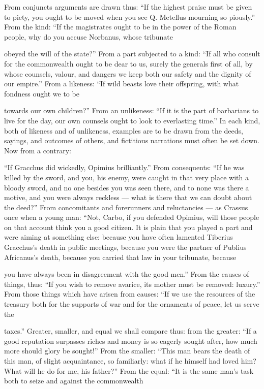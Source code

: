  From conjuncts arguments are drawn thus: ``If the highest praise must be given to piety, you ought to be moved when you see Q. Metellus mourning so piously.'' From the kind: ``If the magistrates ought to be in the power of the Roman people, why do you accuse Norbanus, whose tribunate

 obeyed the will of the state?'' From a part subjected to a kind: ``If all who consult for the commonwealth ought to be dear to us, surely the generals first of all, by whose counsels, valour, and dangers we keep both our safety and the dignity of our empire.'' From a likeness: ``If wild beasts love their offspring, with what fondness ought we to be

 towards our own children?'' From an unlikeness: ``If it is the part of barbarians to live for the day, our own counsels ought to look to everlasting time.'' In each kind, both of likeness and of unlikeness, examples are to be drawn from the deeds, sayings, and outcomes of others, and fictitious narrations must often be set down. Now from a contrary:

 ``If Gracchus did wickedly, Opimius brilliantly.'' From consequents: ``If he was killed by the sword, and you, his enemy, were caught in that very place with a bloody sword, and no one besides you was seen there, and to none was there a motive, and you were always reckless — what is there that we can doubt about the deed?'' From concomitants and forerunners and reluctancies — as Crassus once when a young man: ``Not, Carbo, if you defended Opimius, will those people on that account think you a good citizen. It is plain that you played a part and were aiming at something else: because you have often lamented Tiberius Gracchus's death in public meetings, because you were the partner of Publius Africanus's death, because you carried that law in your tribunate, because

 you have always been in disagreement with the good men.'' From the causes of things, thus: ``If you wish to remove avarice, its mother must be removed: luxury.'' From those things which have arisen from causes: ``If we use the resources of the treasury both for the supports of war and for the ornaments of peace, let us serve the

 taxes.'' Greater, smaller, and equal we shall compare thus: from the greater: ``If a good reputation surpasses riches and money is so eagerly sought after, how much more should glory be sought!'' From the smaller: ``This man bears the death of this man, of slight acquaintance, so familiarly: what if he himself had loved him? What will he do for me, his father?'' From the equal: ``It is the same man's task both to seize and against the commonwealth

